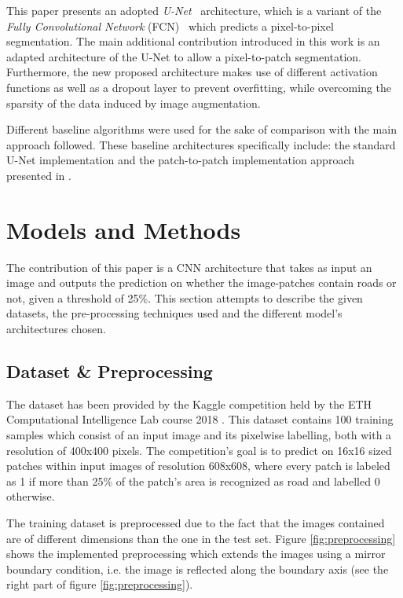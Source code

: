 \documentclass[10pt,conference,compsocconf]{IEEEtran}
\begin{document}
This paper presents an adopted \textit{U-Net}~\cite{Ronneberger2015} architecture, which is a variant of the \textit{Fully Convolutional Network} (FCN)~\cite{Long2014} which predicts a pixel-to-pixel segmentation. The main additional contribution introduced in this work is an adapted architecture of the U-Net to allow a pixel-to-patch segmentation. Furthermore, the new proposed architecture makes use of different activation functions as well as a dropout layer to prevent overfitting, while overcoming the sparsity of the data induced by image augmentation.

Different baseline algorithms were used for the sake of comparison with the main approach followed. These baseline architectures specifically include: the standard U-Net implementation and the patch-to-patch implementation approach presented in \cite{Pavllo2017}.

\section{Models and Methods}

The contribution of this paper is a CNN architecture that takes as input an image and outputs the prediction on whether the image-patches contain roads or not, given a threshold of 25\%. This section attempts to describe the given datasets, the pre-processing techniques used and the different model’s architectures chosen.

\subsection{Dataset \& Preprocessing}

The dataset has been provided by the Kaggle competition held by the ETH Computational Intelligence Lab course 2018 \cite{KaggleCompetition}. This dataset contains 100 training samples which consist of an input image and its pixelwise labelling, both with a resolution of 400x400 pixels. The competition’s goal is to predict on 16x16 sized patches within input images of resolution 608x608, where every patch is labeled as 1 if more than 25\% of the patch’s area is recognized as road and labelled 0 otherwise.

The training dataset is preprocessed due to the fact that the images contained are of different dimensions than the one in the test set. Figure \ref{fig:preprocessing} shows the implemented preprocessing which extends the images using a mirror boundary condition, i.e. the image is reflected along the boundary axis (see the right part of figure \ref{fig:preprocessing}).
\end{document}
